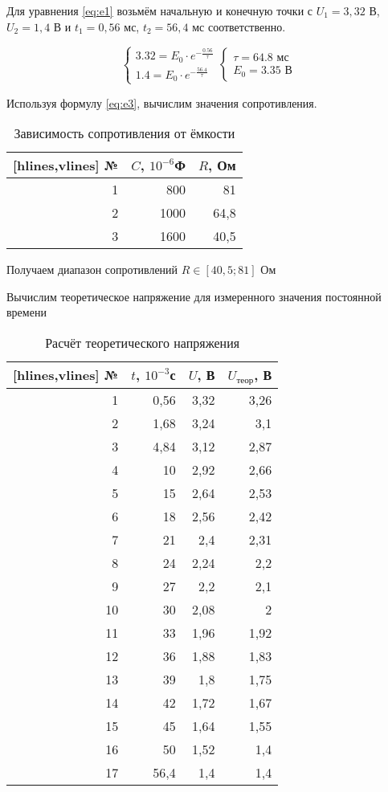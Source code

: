 Для уравнения \eqref{eq:e1} возьмём начальную и конечную точки с $U_1=3,32$ В, $U_2=1,4$ В и $t_1=0,56$ мс, $t_2=56,4$ мс соответственно.

\begin{equation*}
    \begin{cases}
        3.32 = E_0 \cdot e^{-\frac{0.56}{\tau}}\\
        1.4 = E_0 \cdot e^{-\frac{56.4}{\tau}}
    \end{cases}
    \begin{cases}
        \tau = 64.8 \text{ мс}\\
        E_0=3.35 \text{ В}
    \end{cases}
\end{equation*}

Используя формулу \eqref{eq:e3}, вычислим значения сопротивления.
\begin{table}[H]
    \caption{Зависимость сопротивления от ёмкости}
\label{tab:t1}
\centering
 \begin{NiceTabular*}{\linewidth}{@{\extracolsep{\fill}}rrr}[hlines,vlines]
№ & $C$, $10^{-6}$Ф & $R$, Ом \\
 & 800 & 81 \\
2 & 1000 & 64,8 \\
3 & 1600 & 40,5 \\
\end{NiceTabular*}
\end{table}

Получаем диапазон сопротивлений $R \in \left[ 40,5; 81\right]$ Ом

Вычислим теоретическое напряжение для измеренного значения постоянной времени

\begin{table}[H]
    \caption{Расчёт теоретического напряжения}
\label{tab:t1}
\centering
 \begin{NiceTabular*}{\linewidth}{@{\extracolsep{\fill}}rrrr}[hlines,vlines]
№ & $t$, $10^{-3}$с & $U$, В & $U_{\text{теор}}$, В\\
 & 0,56 & 3,32 & 3,26 \\
2 & 1,68 & 3,24 & 3,1 \\
3 & 4,84 & 3,12 & 2,87 \\
4 & 10 & 2,92 & 2,66 \\
5 & 15 & 2,64 & 2,53 \\
6 & 18 & 2,56 & 2,42 \\
7 & 21 & 2,4 & 2,31 \\
8 & 24 & 2,24 & 2,2 \\
9 & 27 & 2,2 & 2,1 \\
10 & 30 & 2,08 & 2 \\
11 & 33 & 1,96 & 1,92 \\
12 & 36 & 1,88 & 1,83 \\
13 & 39 & 1,8 & 1,75 \\
14 & 42 & 1,72 & 1,67 \\
15 & 45 & 1,64 & 1,55 \\
16 & 50 & 1,52 & 1,4 \\
17 & 56,4 & 1,4 & 1,4\\
\end{NiceTabular*}
\end{table}

